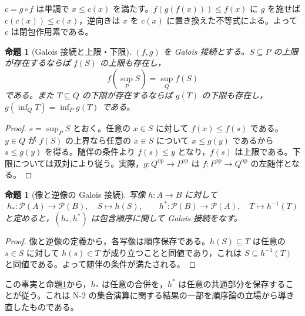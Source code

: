 \documentclass[a5paper,10pt,dvipdfmx]{jsarticle}
\theoremstyle{definition}
\theoremstyle{plain}
\newtheorem{prop}[ruledef]{命題}
\newcommand{\Pow}{\mathcal{P}}
\begin{document}
$c=g\circ f$ は単調で $x\leq c(x)$ を満たす。$f(g(f(x)))\leq f(x)$ に $g$ を施せば $c(c(x))\leq c(x)$，逆向きは $x$ を $c(x)$ に置き換えた不等式による。よって $c$ は閉包作用素である。
\begin{prop}[Galois 接続と上限・下限]\label{k94}
$(f,g)$ を Galois 接続とする。$S\subseteq P$ の上限が存在するならば $f(S)$ の上限も存在し，
\[
 f(\sup_P S)=\sup_Q f(S)
\]
である。また $T\subseteq Q$ の下限が存在するならば $g(T)$ の下限も存在し，$g(\inf_Q T)=\inf_P g(T)$ である。
\end{prop}
\begin{proof}
$s=\sup_P S$ とおく。任意の $x\in S$ に対して $f(x)\leq f(s)$ である。$y\in Q$ が $f(S)$ の上界なら任意の $x\in S$ について $x\leq g(y)$ であるから $s\leq g(y)$ を得る。随伴の条件より $f(s)\leq y$ となり，$f(s)$ は上限である。下限については双対により従う。実際，$g:Q^{\mathrm{op}}\to P^{\mathrm{op}}$ は $f:P^{\mathrm{op}}\to Q^{\mathrm{op}}$ の左随伴となる。
\end{proof}
\begin{prop}[像と逆像の Galois 接続]\label{k95}
写像 $h:A\to B$ に対して
\[
 h_*:\Pow(A)\to\Pow(B),\quad S\mapsto h(S),\qquad
 h^*:\Pow(B)\to\Pow(A),\quad T\mapsto h^{-1}(T)
\]
と定めると，$(h_*,h^*)$ は包含順序に関して Galois 接続をなす。
\end{prop}
\begin{proof}
像と逆像の定義から，各写像は順序保存である。$h(S)\subseteq T$ は任意の $s\in S$ に対して $h(s)\in T$ が成り立つことと同値であり，これは $S\subseteq h^{-1}(T)$ と同値である。よって随伴の条件が満たされる。
\end{proof}
この事実と命題\ref{k94}から，$h_*$ は任意の合併を，$h^*$ は任意の共通部分を保存することが従う。これは N-2 の集合演算に関する結果の一部を順序論の立場から導き直したものである。
\end{document}
